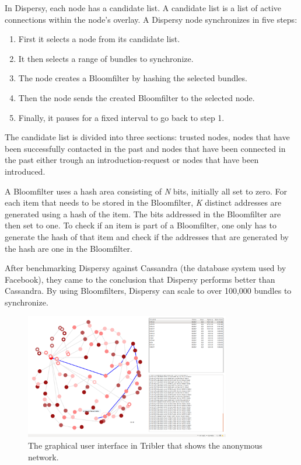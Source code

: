 		In Dispersy, each node has a candidate list. A candidate list is a list of active connections within the node's overlay. A Dispersy node synchronizes in five steps:
		
		\begin{enumerate}
			\item First it selects a node from its candidate list.
			\item It then selects a range of bundles to synchronize.
			\item The node creates a Bloomfilter by hashing the selected bundles.
			\item Then the node sends the created Bloomfilter to the selected node.
			\item Finally, it pauses for a fixed interval to go back to step 1.
		\end{enumerate}
		
		The candidate list is divided into three sections: trusted nodes, nodes that have been successfully contacted in the past and nodes that have been connected in the past either trough an introduction-request or nodes that have been introduced.
		
		A Bloomfilter uses a hash area consisting of \emph{N} bits, initially all set to zero. For each item that needs to be stored in the Bloomfilter, \emph{K} distinct addresses are generated using a hash of the item. The bits addressed in the Bloomfilter are then set to one. To check if an item is part of a Bloomfilter, one only has to generate the hash of that item and check if the addresses that are generated by the hash are one in the Bloomfilter.
		
		After benchmarking Dispersy against Cassandra (the database system used by Facebook), they came to the conclusion that Dispersy performs better than Cassandra. By using Bloomfilters, Dispersy can scale to over 100,000 bundles to synchronize.
	
		\begin{figure}[!t]
			\centering
			\includegraphics[width=0.8\textwidth]{prior-work/8hop.png}
			\caption{The graphical user interface in Tribler that shows the anonymous network.}
			\label{fig:anon_downloads}
		\end{figure}